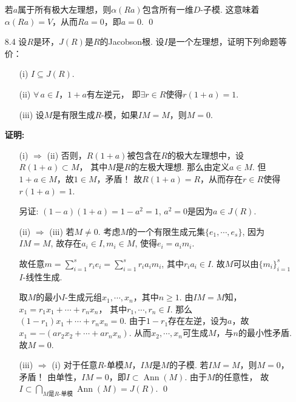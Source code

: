 \begin{enumerate}
            若$a$属于所有极大左理想，则$\alpha(Ra)$包含所有一维$D$-子模.
            这意味着$\alpha(Ra) = V$，从而$Ra = 0$，即$a = 0$. \qed

        \item[8.4]
        设$R$是环，$J(R)$是$R$的Jacobson根. 设$I$是一个左理想，证明下列命题等价：
        \begin{itemize}
            \item[(i)] $I \subseteq J(R)$.
            \item[(ii)] $\forall \, a \in I$，$1+a$有左逆元，
            即$\exists r \in R$使得$r(1+a) = 1$.
            \item[(iii)] 设$M$是有限生成$R$-模，如果$IM = M$，则$M = 0$.
        \end{itemize}
        \item[\textbf{证明:}]
        \begin{itemize}
            \item[(i) $\Rightarrow$ (ii)]
            否则，$R(1+a)$被包含在$R$的极大左理想中，设$R(1+a) \subset M$，
            其中$M$是$R$的左极大理想.
            那么由定义$a \in M$. 但$1+a \in M$，故$1 \in M$，矛盾！
            故$R(1+a) = R$，从而存在$r \in R$使得$r(1+a)=1$.\par
            另证: $(1-a)(1+a)=1-a^2=1$, $a^2=0$是因为$a\in J(R)$.
            \item[(ii) $\Rightarrow$ (iii)]
            若$M \neq 0$. 考虑$M$的一个有限生成元集$\{e_1,\cdots,e_s\}$, 
            因为$IM=M$, 故存在$a_i\in I, m_i\in M$, 使得$e_i=a_im_i$.\par
            故任意$m=\sum\limits_{i=1}^s r_ie_i=\sum\limits_{i=1}^s r_i a_im_i$, 
            其中$r_ia_i\in I$. 故$M$可以由$\{m_i\}_{i=1}^s$ $I$-线性生成.

            取$M$的最小$I$-生成元组$x_{1},\cdots,x_{n}$，其中$n\ge1$.
            由$IM=M$知，$x_{1} = r_{1}x_{1} + \cdots + r_{n}x_{n}$，
            其中$r_{1},\cdots,r_{n} \in I$.
            那么$(1-r_{1})x_{1} + \cdots + r_{n}x_{n} = 0$.
            由于$1-r_{1}$存在左逆，设为$a$，故
            $x_{1} = -(ar_{2}x_{2} + \cdots + ar_{n}x_{n})$.
            从而$x_{2},\cdots,x_{n}$可生成$M$，与$n$的最小性矛盾.
            故$M = 0$.
            \item[(iii) $\Rightarrow$ (i)]
            对于任意$R$-单模$M$，$IM$是$M$的子模.
            若$IM = M$，则$M=0$，矛盾！
            由单性，$IM=0$，即$I \subset \operatorname{Ann}(M)$.
            由于$M$的任意性，
            故$I \subset \bigcap\limits_{M\text{是}R\text{-单模}}
            \operatorname{Ann}(M) = J(R)$. \qed
        \end{itemize}


\end{enumerate}
